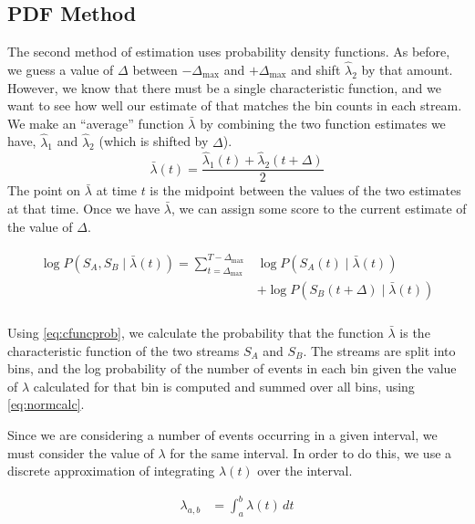 \documentclass[a4paper,11pt]{article}
\begin{document}
\subsection{PDF Method}
\label{sec-4-2}

   The second method of estimation uses probability density functions. As
   before, we guess a value of $\Delta$ between $-\Delta_{\text{max}}$ and
   $+\Delta_{\text{max}}$ and shift $\hat{\lambda}_2$ by that amount. However,
   we know that there must be a single characteristic function, and we want to
   see how well our estimate of that matches the bin counts in each stream. We
   make an ``average'' function $\bar{\lambda}$ by combining the two function
   estimates we have, $\hat{\lambda}_1$ and $\hat{\lambda}_2$ (which is shifted
   by $\Delta$).
   \begin{equation}
   \bar{\lambda}(t)=\frac{\hat{\lambda}_1(t)+\hat{\lambda}_2(t+\Delta)}{2}
   \end{equation}
   The point on $\bar{\lambda}$ at time $t$ is the midpoint between the values of
   the two estimates at that time. Once we have $\bar{\lambda}$, we can assign some
   score to the current estimate of the value of $\Delta$.

   \begin{align}
   \begin{split}
   \log P(S_A,S_B\mid\bar{\lambda}(t))=\sum_{t=\Delta_{\text{max}}}^{T-\Delta_{\text{max}}}&\log P(S_A(t)\mid \bar{\lambda}(t))\\
   &+ \log P(S_B(t+\Delta)\mid \bar{\lambda}(t))\\
   \label{eq:cfuncprob}
   \end{split}
   \end{align}
   
   Using \eqref{eq:cfuncprob}, we calculate the probability that the function
   $\bar{\lambda}$ is the characteristic function of the two streams $S_A$ and
   $S_B$. The streams are split into bins, and the log probability of the number
   of events in each bin given the value of $\lambda$ calculated for that bin is
   computed and summed over all bins, using \eqref{eq:normcalc}.

   Since we are considering a number of events occurring in a given interval, we
   must consider the value of $\lambda$ for the same interval. In order to do
   this, we use a discrete approximation of integrating $\lambda(t)$ over the
   interval.

   \begin{align}
   \lambda_{a,b}&=\int_a^b\lambda(t)\,dt
   \end{align}
   
\end{document}
